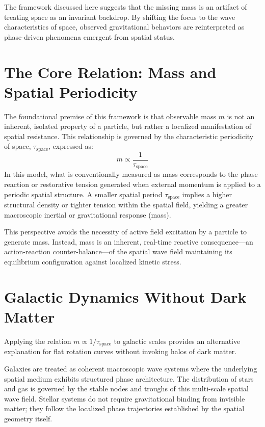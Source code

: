\documentclass[12pt]{article}
\begin{document}
The framework discussed here suggests that the missing mass is an artifact of treating space as an invariant backdrop. By shifting the focus to the wave characteristics of space, observed gravitational behaviors are reinterpreted as phase-driven phenomena emergent from spatial status.

\section{The Core Relation: Mass and Spatial Periodicity}

The foundational premise of this framework is that observable mass \( m \) is not an inherent, isolated property of a particle, but rather a localized manifestation of spatial resistance. This relationship is governed by the characteristic periodicity of space, \( \tau_{\text{space}} \), expressed as:
\[
m \propto \frac{1}{\tau_{\text{space}}}
\]
In this model, what is conventionally measured as mass corresponds to the phase reaction or restorative tension generated when external momentum is applied to a periodic spatial structure. A smaller spatial period \( \tau_{\text{space}} \) implies a higher structural density or tighter tension within the spatial field, yielding a greater macroscopic inertial or gravitational response (mass). 

This perspective avoids the necessity of active field excitation by a particle to generate mass. Instead, mass is an inherent, real-time reactive consequence—an action-reaction counter-balance—of the spatial wave field maintaining its equilibrium configuration against localized kinetic stress.

\section{Galactic Dynamics Without Dark Matter}

Applying the relation \( m \propto 1/\tau_{\text{space}} \) to galactic scales provides an alternative explanation for flat rotation curves without invoking halos of dark matter. 

Galaxies are treated as coherent macroscopic wave systems where the underlying spatial medium exhibits structured phase architecture. The distribution of stars and gas is governed by the stable nodes and troughs of this multi-scale spatial wave field. Stellar systems do not require gravitational binding from invisible matter; they follow the localized phase trajectories established by the spatial geometry itself.
\end{document}
